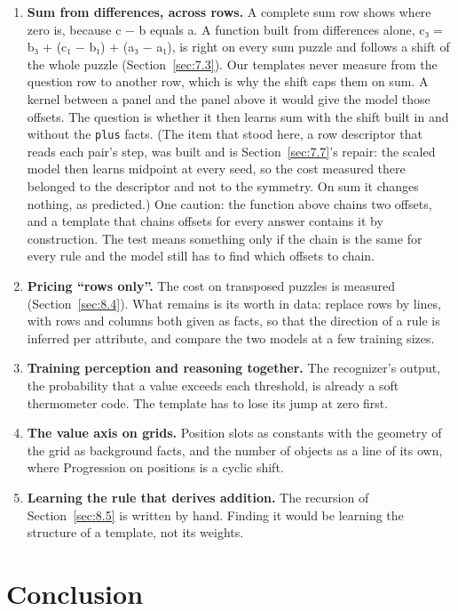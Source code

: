 \begin{enumerate}
\item \textbf{Sum from differences, across rows.} A complete sum row shows where zero is, because c − b equals a. A function built from differences alone, c₃ = b₃ + (c₁ − b₁) + (a₃ − a₁), is right on every sum puzzle and follows a shift of the whole puzzle (Section~\ref{sec:7.3}). Our templates never measure from the question row to another row, which is why the shift caps them on sum. A kernel between a panel and the panel above it would give the model those offsets. The question is whether it then learns sum with the shift built in and without the \texttt{plus} facts. (The item that stood here, a row descriptor that reads each pair's step, was built and is Section~\ref{sec:7.7}'s repair: the scaled model then learns midpoint at every seed, so the cost measured there belonged to the descriptor and not to the symmetry. On sum it changes nothing, as predicted.) One caution: the function above chains two offsets, and a template that chains offsets for every answer contains it by construction. The test means something only if the chain is the same for every rule and the model still has to find which offsets to chain.
\item \textbf{Pricing ``rows only''.} The cost on transposed puzzles is measured (Section~\ref{sec:8.4}). What remains is its worth in data: replace rows by lines, with rows and columns both given as facts, so that the direction of a rule is inferred per attribute, and compare the two models at a few training sizes.
\item \textbf{Training perception and reasoning together.} The recognizer's output, the probability that a value exceeds each threshold, is already a soft thermometer code. The template has to lose its jump at zero first.
\item \textbf{The value axis on grids.} Position slots as constants with the geometry of the grid as background facts, and the number of objects as a line of its own, where Progression on positions is a cyclic shift.
\item \textbf{Learning the rule that derives addition.} The recursion of Section~\ref{sec:8.5} is written by hand. Finding it would be learning the structure of a template, not its weights.
\end{enumerate}

\section{Conclusion}\label{sec:8.8}

